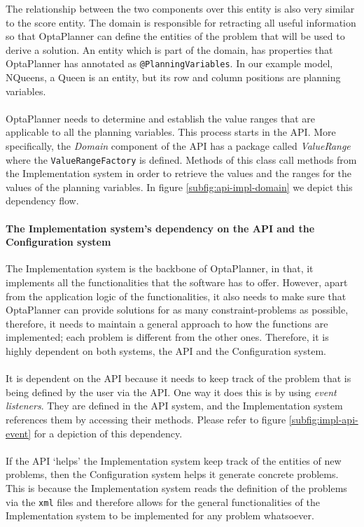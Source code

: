 The relationship between the two components over this entity is also very similar to the score entity. The domain is responsible for retracting all useful information so that OptaPlanner can define the entities of the problem that will be used to derive a solution. An entity which is part of the domain, has properties that OptaPlanner has annotated as \verb!@PlanningVariables!. In our example model, NQueens, a Queen is an entity, but its row and column positions are planning variables. \\\\
OptaPlanner needs to determine and establish the value ranges that are applicable to all the planning variables. This process starts in the API. More specifically, the \textit{Domain} component of the API has a package called \textit{ValueRange} where the \verb!ValueRangeFactory! is defined. Methods of this class call methods from the Implementation system in order to retrieve the values and the ranges for the values of the planning variables. In figure \ref{subfig:api-impl-domain} we depict this dependency flow.
\paragraph{The Implementation system's dependency on the API and the Configuration system}
The Implementation system is the backbone of OptaPlanner, in that, it implements all the functionalities that the software has to offer. However, apart from the application logic of the functionalities, it also needs to make sure that OptaPlanner can provide solutions for as many constraint-problems as possible, therefore, it needs to maintain a general approach to how the functions are implemented; each problem is different from the other ones. Therefore, it is highly dependent on both systems, the API and the Configuration system.\\\\
It is dependent on the API because it needs to keep track of the problem that is being defined by the user via the API. One way it does this is by using \textit{event listeners}. They are defined in the API system, and the Implementation system references them by accessing their methods. Please refer to figure \ref{subfig:impl-api-event} for a depiction of this dependency.\\\\
If the API `helps' the Implementation system keep track of the entities of new problems, then the Configuration system helps it generate concrete problems. This is because the Implementation system reads the definition of the problems via the \verb!xml! files and therefore allows for the general functionalities of the Implementation system to be implemented for any problem whatsoever.
